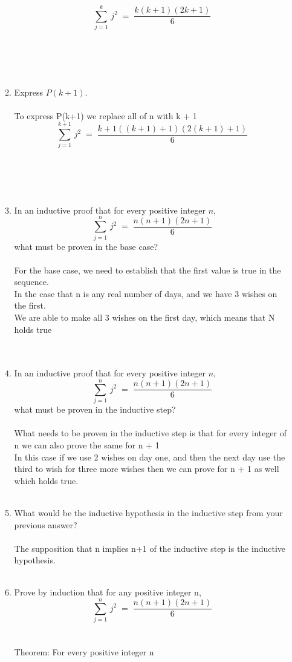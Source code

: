 \begin{enumerate}
\begin{enumerate}[label=(\alph*)]
\[\displaystyle \sum_{j=1}^{k}\, j^2 \;=\;\frac{k(k+1)(2k+1)}{6}\]\\\\
   \\\\
  \item Express $P(k+1)$.\\\\
To express P(k+1) we replace all of n with k + 1 \\
\[\displaystyle \sum_{j=1}^{k + 1}\, j^2 \;=\;\frac{k + 1((k + 1) +1)(2(k + 1) +1)}{6}\]\\\\
   \\\\
   \item In an inductive proof that for every positive integer $n$,
   \[\displaystyle \sum_{j=1}^{n}\, j^2 \;=\;\frac{n(n+1)(2n+1)}{6}\]
   what must be proven in the base case?\\\\
For the base case, we need to establish that the first value is true in the sequence. \\

In the case that n is any real number of days, and we have 3 wishes on the first. \\

We are able to make all 3 wishes on the first day, which means that N holds true \\


    \\\\
    \item In an inductive proof that for every positive integer $n$,
   \[\displaystyle \sum_{j=1}^{n}\, j^2 \;=\;\frac{n(n+1)(2n+1)}{6}\]
   what must be proven in the inductive step?\\\\
What needs to be proven in the inductive step is that for every integer of n we can also prove the same for n + 1 \\
In this case if we use 2 wishes on day one, and then the next day use the third to wish for three more wishes then we can prove for n + 1 as well which holds true.
   \\\\
   \item What would be the inductive hypothesis in the inductive step from your previous answer?\\\\
    The supposition that n implies n+1 of the inductive step is the inductive hypothesis.
    \\\\
   \item Prove by induction that for any positive integer n,
   \[\displaystyle \sum_{j=1}^{n}\, j^2 \;=\;\frac{n(n+1)(2n+1)}{6}\] \\\\
Theorem: For every positive integer n \\


\end{enumerate}
\end{enumerate}
